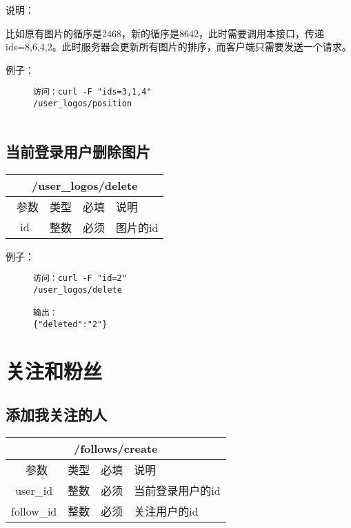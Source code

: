 \documentclass[cs4size]{ctexartutf8}
\begin{document}
说明：

比如原有图片的循序是2468，新的循序是8642，此时需要调用本接口，传递ids=8,6,4,2。此时服务器会更新所有图片的排序，而客户端只需要发送一个请求。

例子：

\begin{figure}[H]
\begin{verbatim}
访问：curl -F "ids=3,1,4" 
/user_logos/position


\end{verbatim}
\end{figure}



\subsection{当前登录用户删除图片}

\begin{table}[H]
   \begin{center}
\begin{tabular}{|c|c|c|p{12cm}|}
\hline
\multicolumn{4}{|c|}{/user\_logos/delete} \\
\hline\hline
 \  参数  & 类型 & 必填 &  说明  \\
\hline
 id  & 整数 & 必须 &  图片的id\\
\hline
\end{tabular}
   \end{center}
\end{table}

例子：

\begin{figure}[H]
\begin{verbatim}
访问：curl -F "id=2" 
/user_logos/delete

输出：
{"deleted":"2"}

\end{verbatim}
\end{figure}


\section{关注和粉丝}
\subsection{添加我关注的人}

\begin{table}[H]
   \begin{center}
\begin{tabular}{|c|c|c|p{12cm}|}
\hline
\multicolumn{4}{|c|}{/follows/create} \\
\hline\hline
 \  参数  & 类型 & 必填 &  说明  \\
\hline
 user\_id  & 整数 & 必须 &  当前登录用户的id\\
\hline
 follow\_id  & 整数 & 必须 &  关注用户的id\\
\hline
\end{tabular}
   \end{center}
\end{table}
\end{document}
